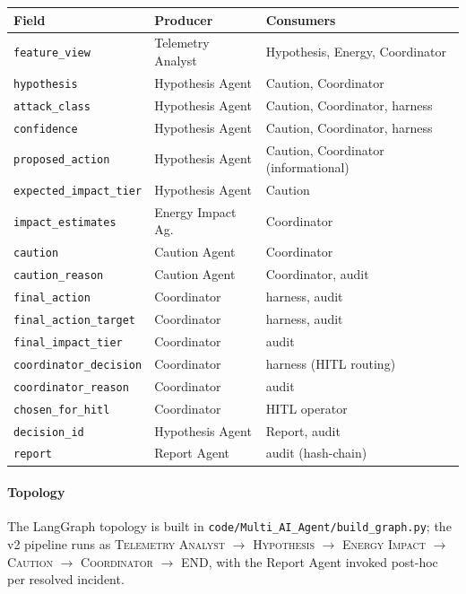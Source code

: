 \begin{tabular}{lll}
\toprule
Field & Producer & Consumers \\
\midrule
\texttt{feature\_view}        & Telemetry Analyst & Hypothesis, Energy, Coordinator \\
\texttt{hypothesis}           & Hypothesis Agent  & Caution, Coordinator \\
\texttt{attack\_class}        & Hypothesis Agent  & Caution, Coordinator, harness \\
\texttt{confidence}           & Hypothesis Agent  & Caution, Coordinator, harness \\
\texttt{proposed\_action}     & Hypothesis Agent  & Caution, Coordinator (informational) \\
\texttt{expected\_impact\_tier}& Hypothesis Agent & Caution \\
\texttt{impact\_estimates}    & Energy Impact Ag. & Coordinator \\
\texttt{caution}              & Caution Agent     & Coordinator \\
\texttt{caution\_reason}      & Caution Agent     & Coordinator, audit \\
\texttt{final\_action}        & Coordinator       & harness, audit \\
\texttt{final\_action\_target}& Coordinator       & harness, audit \\
\texttt{final\_impact\_tier}  & Coordinator       & audit \\
\texttt{coordinator\_decision}& Coordinator       & harness (HITL routing) \\
\texttt{coordinator\_reason}  & Coordinator       & audit \\
\texttt{chosen\_for\_hitl}    & Coordinator       & HITL operator \\
\texttt{decision\_id}         & Hypothesis Agent  & Report, audit \\
\texttt{report}               & Report Agent      & audit (hash-chain) \\
\bottomrule
\end{tabular}

\paragraph{Topology}
The LangGraph topology is built in
\texttt{code/Multi\_AI\_Agent/build\_graph.py}; the v2 pipeline runs as
\textsc{Telemetry Analyst} $\to$ \textsc{Hypothesis} $\to$
\textsc{Energy Impact} $\to$ \textsc{Caution} $\to$
\textsc{Coordinator} $\to$ END, with the Report Agent invoked
post-hoc per resolved incident.
